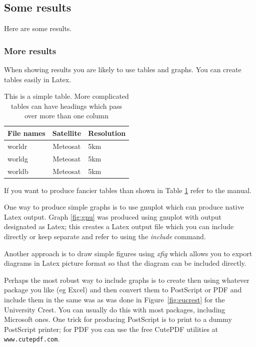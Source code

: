 \documentclass[12pt,a4paper]{article}
\begin{document}
\subsection{Some results}
Here are some results.

\subsubsection{More results}
When showing results you are likely to use tables and graphs. You can
create tables easily in Latex.

\begin{table}[h]
\begin{center}
\begin{tabular}{||l|c|l||}
\hline
{\bf File names} & {\bf Satellite} & {\bf Resolution}\\
\hline
  worldr         &  Meteosat     &   5km\\
  worldg         &  Meteosat     &   5km\\
  worldb         &  Meteosat     &   5km\\
\hline
\end{tabular}
\end{center}
\caption{This is a simple table. More complicated tables can have
headings which pass over more than one column}
\label{simple_table}
\end{table}

If you want to produce fancier tables than shown in Table \ref{simple_table}
refer to the manual.


One way to produce simple graphs is to use gnuplot which can produce
native Latex output. Graph \ref{fig:gnu} was produced using gnuplot with
output designated as Latex; this creates a Latex output file which you
can include directly or keep separate and refer to using the {\em
include} command.

Another approach is to draw simple figures using {\em xfig} which allows
you to export diagrams in Latex picture format so that the diagram can
be included directly.

Perhaps the most robust way to include graphs is to create then using
whatever package you like (eg Excel) and then convert them to PostScript
or PDF and include them in the same was as was done in
Figure~\ref{fig:eucrest} for the University Crest. You can usually do
this with most packages, including Microsoft ones. One trick for
producing PostScript is to print to a dummy PostScript printer; for PDF
you can use the free CutePDF utilities at {\verb+www.cutepdf.com+}.
\end{document}
